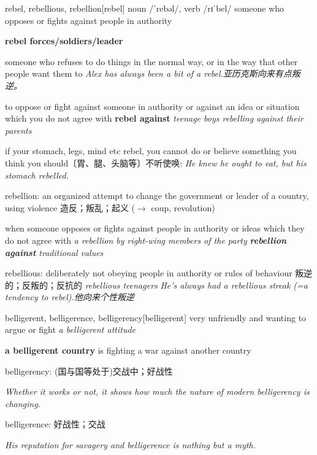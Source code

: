 \begin{DefWord}{rebel, rebellious, rebellion}[rebel]
    noun /ˈrebəl/, verb /rɪˈbel/
    someone who opposes or fights against people in authority

    \textbf{rebel forces/soldiers/leader}

    someone who refuses to do things in the normal way, or in the way that other people want them to
    \textit{Alex has always been a bit of a rebel.亚历克斯向来有点叛逆。}

    to oppose or fight against someone in authority or against an idea or situation which you do not agree with
    \textbf{rebel against}
    \textit{teenage boys rebelling against their parents}

    if your stomach, legs, mind etc rebel, you cannot do or believe something you think you should〔胃、腿、头脑等〕不听使唤:
    \textit{He knew he ought to eat, but his stomach rebelled.}

    rebellion: an organized attempt to change the government or leader of a country, using violence 造反；叛乱；起义 ($\rightarrow$ coup, revolution)

    when someone opposes or fights against people in authority or ideas which they do not agree with
    \textit{a rebellion by right-wing members of the party}
    \textit{\textbf{rebellion against} traditional values}

    rebellious: deliberately not obeying people in authority or rules of behaviour 叛逆的；反叛的；反抗的
    \textit{rebellious teenagers}
    \textit{He's always had a rebellious streak (=a tendency to rebel).他向来个性叛逆}
\end{DefWord}

\begin{DefWord}{belligerent, belligerence, belligerency}[belligerent]
    very unfriendly and wanting to argue or fight
    \textit{a belligerent attitude}

    \textbf{a belligerent country} is fighting a war against another country

    belligerency: (国与国等处于)交战中；好战性

    \textit{Whether it works or not, it shows how much the nature of modern belligerency is changing.}
    
    belligerence: 好战性；交战

    \textit{His reputation for savagery and belligerence is nothing but a myth.}
\end{DefWord}

